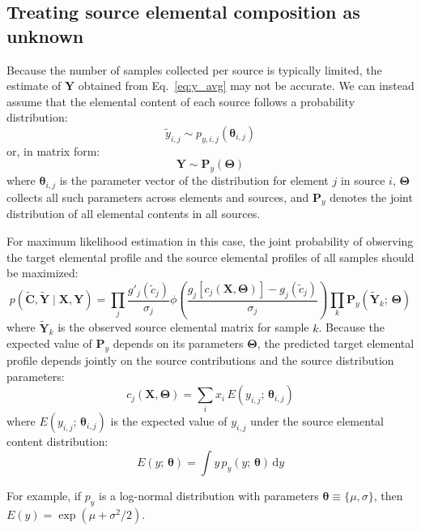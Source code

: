 \subsection{Treating source elemental composition as unknown}
Because the number of samples collected per source is typically limited, the estimate of $\mathbf{Y}$ obtained from Eq.~\eqref{eq:y_avg} may not be accurate. We can instead assume that the elemental content of each source follows a probability distribution:
\begin{equation}
    \tilde{y}_{i,j} \sim p_{y,i,j}(\bm{\theta}_{i,j})
\end{equation}
or, in matrix form:
\begin{equation}
    \mathbf{Y} \sim \mathbf{P}_y(\bm{\Theta})
\end{equation}
where $\bm{\theta}_{i,j}$ is the parameter vector of the distribution for element $j$ in source $i$, $\bm{\Theta}$ collects all such parameters across elements and sources, and $\mathbf{P}_y$ denotes the joint distribution of all elemental contents in all sources.

For maximum likelihood estimation in this case, the joint probability of observing the target elemental profile and the source elemental profiles of all samples should be maximized:
\begin{equation}\label{eq:loglikelihood-with-y}
    p(\tilde{\mathbf{C}}, \tilde{\mathbf{Y}} \mid \mathbf{X}, \mathbf{Y}) = \prod_j \frac{g'_j(\tilde{c}_j)}{\sigma_j} \phi\!\left(\frac{g_j[c_j(\mathbf{X}, \bm{\Theta})] - g_j(\tilde{c}_j)}{\sigma_j}\right) \prod_k \mathbf{P}_y(\tilde{\mathbf{Y}}_k;\, \bm{\Theta})
\end{equation}
where $\tilde{\mathbf{Y}}_k$ is the observed source elemental matrix for sample $k$. Because the expected value of $\mathbf{P}_y$ depends on its parameters $\bm{\Theta}$, the predicted target elemental profile depends jointly on the source contributions and the source distribution parameters:
\begin{equation}\label{eq:c_with_theta}
    c_j(\mathbf{X}, \bm{\Theta}) = \sum_i x_i\, E(y_{i,j};\, \bm{\theta}_{i,j})
\end{equation}
where $E(y_{i,j};\, \bm{\theta}_{i,j})$ is the expected value of $y_{i,j}$ under the source elemental content distribution:
\begin{equation}
    E(y;\, \bm{\theta}) = \int y\, p_y(y;\, \bm{\theta})\, \mathrm{d}y
\end{equation}

For example, if $p_y$ is a log-normal distribution with parameters $\bm{\theta} \equiv \{\mu, \sigma\}$, then $E(y) = \exp(\mu + \sigma^2/2)$.

